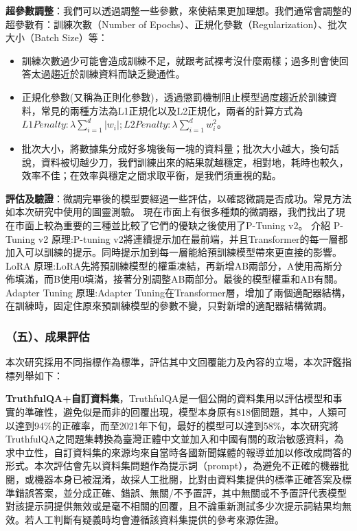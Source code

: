 \documentclass[8pt,a4paper,新細明體,UTF8,natbib]{article}
\begin{document}
\begin{CJK*}{UTF8}{bsmi}
	\textbf{超參數調整}：我們可以透過調整一些參數，來使結果更加理想。我們通常會調整的超參數有：訓練次數（Number of Epochs）、正規化參數（Regularization）、批次大小（Batch Size）等：
	\begin{itemize}
		\item 訓練次數過少可能會造成訓練不足，就跟考試裸考沒什麼兩樣；過多則會使回答太過趨近於訓練資料而缺乏變通性。
		\item 正規化參數(又稱為正則化參數)，透過懲罰機制阻止模型過度趨近於訓練資料，常見的兩種方法為L1正規化以及L2正規化，兩者的計算方式為$L1 Penalty:\lambda\sum_{i=1}^{d}|w_i|;L2 Penalty:\lambda\sum_{i=1}^{d}w^2_i$。
		\item 批次大小，將數據集分成好多塊後每一塊的資料量；批次大小越大，換句話說，資料被切越少刀，我們訓練出來的結果就越穩定，相對地，耗時也較久，效率不佳；在效率與穩定之間求取平衡，是我們須重視的點。
	\end{itemize}

	\textbf{評估及驗證}：微調完畢後的模型要經過一些評估，以確認微調是否成功。常見方法如本次研究中使用的圖靈測驗。
	現在市面上有很多種類的微調器，我們找出了現在市面上較為重要的三種並比較了它們的優缺之後使用了P-Tuning v2。
	介紹
	P-Tuning v2
	原理:P-tuning v2將連續提示加在最前端，并且Transformer的每一層都加入可以訓練的提示。同時提示加到每一層能給預訓練模型帶來更直接的影響。
	LoRA
	原理:LoRA先將預訓練模型的權重凍結，再新增AB兩部分，A使用高斯分佈填滿，而B使用0填滿，接著分別調整AB兩部分。最後的模型權重和AB有關。
	Adapter Tuning
	原理:Adapter Tuning在Transformer層，增加了兩個適配器結構，在訓練時，固定住原來預訓練模型的參數不變，只對新增的適配器結構微調。


	\subsubsection{（五）、成果評估}
	本次研究採用不同指標作為標準，評估其中文回覆能力及內容的立場，本次評鑑指標列舉如下：
	\newline

	\textbf{TruthfulQA+自訂資料集}，TruthfulQA是一個公開的資料集用以評估模型和事實的準確性，避免似是而非的回覆出現，模型本身原有818個問題，其中，人類可以達到94\%的正確率，而至2021年下旬，最好的模型可以達到58\%\cite{lin2022truthfulqa}，本次研究將TruthfulQA之問題集轉換為臺灣正體中文並加入和中國有關的政治敏感資料，為求中立性，自訂資料集的來源均來自當時各國新聞媒體的報導並加以修改成問答的形式。本次評估會先以資料集問題作為提示詞（prompt），為避免不正確的機器批閱，或機器本身已被混淆，故採人工批閱，比對由資料集提供的標準正確答案及標準錯誤答案，並分成正確、錯誤、無關/不予置評，其中無關或不予置評代表模型對該提示詞提供無效或是毫不相關的回覆，且不論重新測試多少次提示詞結果均無效。若人工判斷有疑義時均會遵循該資料集提供的參考來源佐證。


\end{CJK*}
\end{document}
